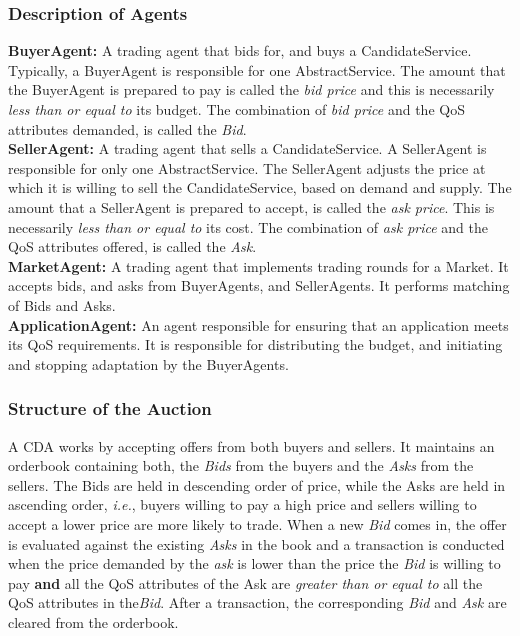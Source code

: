 \documentclass[10pt,journal,compsoc]{IEEEtran}
\begin{document}
\subsubsection{Description of Agents}
\textbf{BuyerAgent:} A trading agent that bids for, and buys a CandidateService. Typically, a BuyerAgent is responsible for one AbstractService. The amount that the BuyerAgent is prepared to pay is called the \textsl{bid price} and this is necessarily \textit{less than or equal to} its budget. The combination of \textsl{bid price}  and the QoS attributes demanded, is called the \textsl{Bid}.\\
\textbf{SellerAgent:} A trading agent that sells a CandidateService. A SellerAgent is responsible for only one AbstractService. The SellerAgent adjusts the price at which it is willing to sell the CandidateService, based on demand and supply. The amount that a SellerAgent is prepared to accept, is called the \textsl{ask price}. This is necessarily \textit{less than or equal to } its cost. The combination of \textsl{ask price} and the QoS attributes offered, is called the \textsl{Ask}.\\
\textbf{MarketAgent:} A trading agent that implements trading rounds for a Market. It accepts bids, and asks from BuyerAgents, and SellerAgents. It performs matching of Bids and Asks.\\
\textbf{ApplicationAgent:} An agent responsible for ensuring that an application meets its QoS requirements. It is responsible for distributing the budget, and initiating and stopping adaptation by the BuyerAgents.

\subsubsection{Structure of the Auction}
A CDA works by accepting offers from both buyers and sellers. It maintains an orderbook containing both, the \textsl{Bids} from the buyers and the \textsl{Asks} from the sellers. The Bids are held in descending order of price, while the Asks are held in ascending order, \textit{i.e.}, buyers willing to pay a high price and sellers willing to accept a lower price are more likely to trade. When a new \textit{Bid} comes in, the offer is evaluated against the existing \textit{Asks} in the book and a transaction is conducted when the price demanded by the \textit{ask} is lower than the price the \textit{Bid} is willing to pay \textbf{and} all the QoS attributes of the Ask are \textit{greater than or equal to} all the QoS attributes in the\textit{Bid}. After a transaction, the corresponding \textit{Bid} and \textit{Ask} are cleared from the orderbook.
\end{document}
